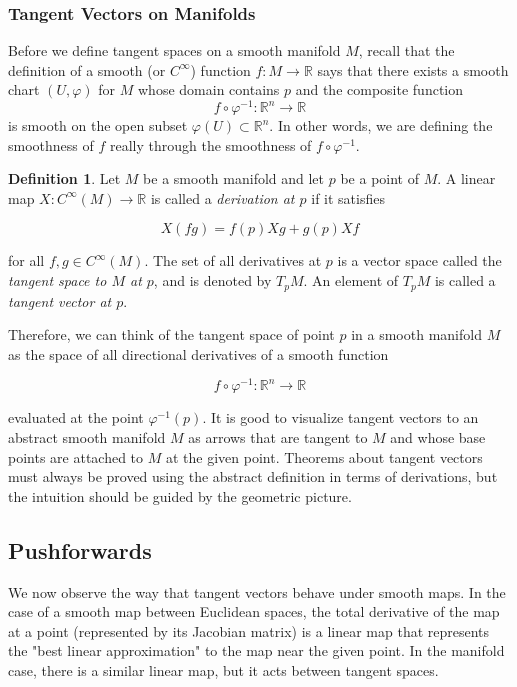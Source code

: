 \documentclass{article}
\theoremstyle{remark}
\theoremstyle{definition}
\newtheorem{definition}{Definition}[section]
\begin{document}
    \subsubsection{Tangent Vectors on Manifolds}

      Before we define tangent spaces on a smooth manifold $M$, recall that the definition of a smooth (or $C^\infty$) function $f: M \longrightarrow \mathbb{R}$ says that there exists a smooth chart $(U, \varphi)$ for $M$ whose domain contains $p$ and the composite function
      \[f \circ \varphi^{-1}: \mathbb{R}^n \longrightarrow \mathbb{R}\]
      is smooth on the open subset $\varphi(U) \subset \mathbb{R}^n$. In other words, we are defining the smoothness of $f$ really through the smoothness of $f \circ \varphi^{-1}$. 

      \begin{definition}
        Let $M$ be a smooth manifold and let $p$ be a point of $M$. A linear map $X: C^\infty (M) \longrightarrow \mathbb{R}$ is called a \textit{derivation at $p$} if it satisfies 

          \[X(f g) = f(p) X g + g(p) X f\]

        for all $f, g \in C^\infty (M)$. The set of all derivatives at $p$ is a vector space called the \textit{tangent space to $M$ at $p$}, and is denoted by $T_p M$. An element of $T_p M$ is called a \textit{tangent vector at $p$}. 
      \end{definition}

      Therefore, we can think of the tangent space of point $p$ in a smooth manifold $M$ as the space of all directional derivatives of a smooth function 

        \[f \circ \varphi^{-1}: \mathbb{R}^n \longrightarrow \mathbb{R}\]

      evaluated at the point $\varphi^{-1} (p)$. It is good to visualize tangent vectors to an abstract smooth manifold $M$ as arrows that are tangent to $M$ and whose base points are attached to $M$ at the given point. Theorems about tangent vectors must always be proved using the abstract definition in terms of derivations, but the intuition should be guided by the geometric picture. 

  \subsection{Pushforwards}

    We now observe the way that tangent vectors behave under smooth maps. In the case of a smooth map between Euclidean spaces, the total derivative of the map at a point (represented by its Jacobian matrix) is a linear map that represents the "best linear approximation" to the map near the given point. In the manifold case, there is a similar linear map, but it acts between tangent spaces. 
\end{document}
